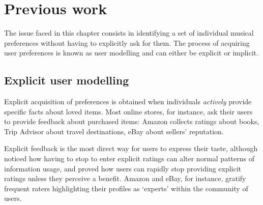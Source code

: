  
% 
% 
% 


\section{Previous work} %
\label{sec:user_modelling_techniques}

The issue faced in this chapter consists in identifying a set of individual musical preferences without having to explicitly ask for them.
The process of acquiring user preferences is known as user modelling \cite{Rich79,Kass88,Kobsa01} and can either be explicit or implicit.

\subsection{Explicit user modelling} %
\label{sub:explicit_models}

Explicit acquisition of preferences is obtained when individuals \emph{actively} provide specific facts about loved items.
Most online stores, for instance, ask their users to provide feedback about purchased items: Amazon collects ratings about books, Trip Advisor about travel destinations, eBay about sellers' reputation.

Explicit feedback is the most direct way for users to express their taste, although \citet{Claypool01} noticed how having to stop to enter explicit ratings can alter normal patterns of information usage, and \citet{Zhang02} proved how users can rapidly stop providing explicit ratings unless they perceive a benefit. 
Amazon and eBay, for instance, gratify frequent raters highlighting their profiles as `experts' within the community of users.

